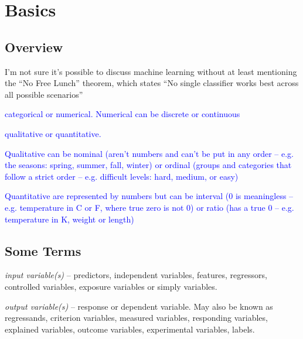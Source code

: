 \chapter{Basics}

\section{Overview}

I'm not sure it's possible to discuss machine learning without at least mentioning the ``No Free Lunch'' theorem, which states ``No single classifier works best across all possible scenarios''

\textcolor{blue}{categorical or numerical. Numerical can be discrete or continuous}

\textcolor{blue}{qualitative or quantitative.} 

\textcolor{blue}{Qualitative can be nominal (aren't numbers and can't be put in any order -- e.g. the seasons: spring, summer, fall, winter) or ordinal (groups and categories that follow a strict order -- e.g. difficult levels: hard, medium, or easy)}

\textcolor{blue}{Quantitative are represented by numbers but can be interval (0 is meaningless -- e.g. temperature in C or F, where true zero is not 0) or ratio (has a true 0 -- e.g. temperature in K, weight or length)}












\section{Some Terms}

\emph{input variable(s)} -- predictors, independent variables, features, regressors, controlled variables, exposure variables or simply variables.
 
\emph{output variable(s)} -- response or dependent variable. May also be known as regressands, criterion variables, measured variables, responding variables, explained variables, outcome variables, experimental variables, labels.

